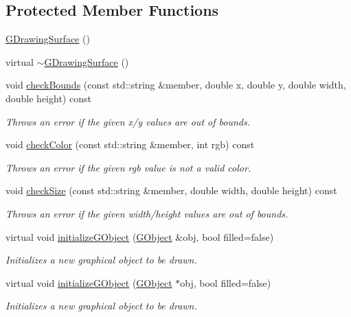 \subsection*{Protected Member Functions}
\begin{DoxyCompactItemize}
\item 
\mbox{\hyperlink{classsgl_1_1GDrawingSurface_a58ecf070e0880ac371754b3e6b4fd970}{G\+Drawing\+Surface}} ()
\item 
virtual \mbox{\hyperlink{classsgl_1_1GDrawingSurface_a8e2c882a0c4e31fcbcbb86a207425c1f}{$\sim$\+G\+Drawing\+Surface}} ()
\item 
void \mbox{\hyperlink{classsgl_1_1GDrawingSurface_a3a690bcb2d62250c9e4722ad7c1b9ab6}{check\+Bounds}} (const std\+::string \&member, double x, double y, double width, double height) const
\begin{DoxyCompactList}\small\item\em Throws an error if the given x/y values are out of bounds. \end{DoxyCompactList}\item 
void \mbox{\hyperlink{classsgl_1_1GDrawingSurface_a9841b5dc607ca41a14819d80e1d8a09c}{check\+Color}} (const std\+::string \&member, int rgb) const
\begin{DoxyCompactList}\small\item\em Throws an error if the given rgb value is not a valid color. \end{DoxyCompactList}\item 
void \mbox{\hyperlink{classsgl_1_1GDrawingSurface_a70a6546707ae708573396616bd0f5320}{check\+Size}} (const std\+::string \&member, double width, double height) const
\begin{DoxyCompactList}\small\item\em Throws an error if the given width/height values are out of bounds. \end{DoxyCompactList}\item 
virtual void \mbox{\hyperlink{classsgl_1_1GDrawingSurface_a814498efebc5586645159cd22990cf61}{initialize\+G\+Object}} (\mbox{\hyperlink{classsgl_1_1GObject}{G\+Object}} \&obj, bool filled=false)
\begin{DoxyCompactList}\small\item\em Initializes a new graphical object to be drawn. \end{DoxyCompactList}\item 
virtual void \mbox{\hyperlink{classsgl_1_1GDrawingSurface_a43e6bc951980da061ddc40407daee227}{initialize\+G\+Object}} (\mbox{\hyperlink{classsgl_1_1GObject}{G\+Object}} $\ast$obj, bool filled=false)
\begin{DoxyCompactList}\small\item\em Initializes a new graphical object to be drawn. \end{DoxyCompactList}\end{DoxyCompactItemize}
